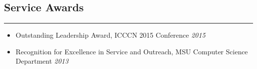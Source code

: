 %
%


\subsection*{Service Awards}
\hrule
\vspace{0.2cm}
\begin{itemize}

    \item Outstanding Leadership Award,
    ICCCN 2015 Conference
    \hfill \textit{2015}

    \item Recognition for Excellence in Service and Outreach,
    MSU Computer Science Department
    \hfill \textit{2013}

\end{itemize}
